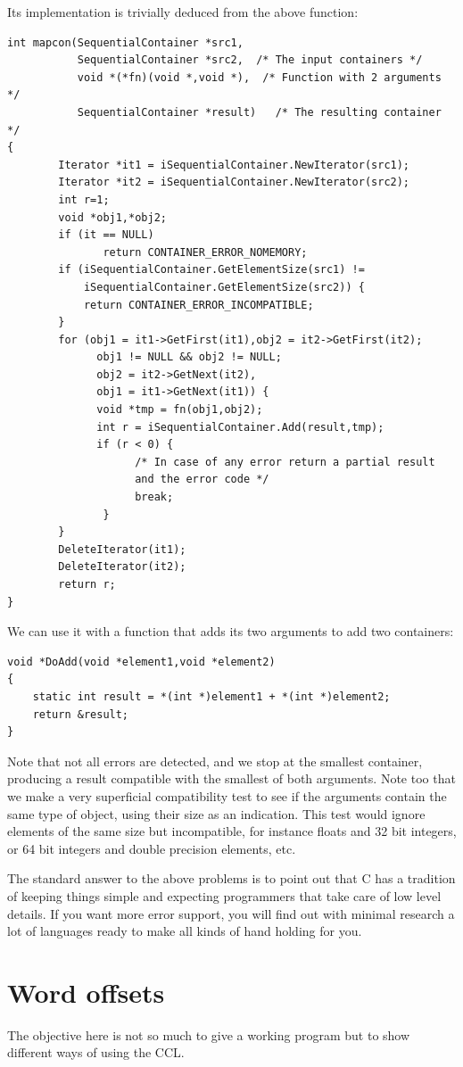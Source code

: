 \documentclass[12pt,a4paper]{memoir} %
\begin{document}
{{Its implementation is trivially deduced from the above function:
\begin{verbatim}
int mapcon(SequentialContainer *src1,
           SequentialContainer *src2,  /* The input containers */
           void *(*fn)(void *,void *),  /* Function with 2 arguments */
           SequentialContainer *result)   /* The resulting container */
{
        Iterator *it1 = iSequentialContainer.NewIterator(src1);
        Iterator *it2 = iSequentialContainer.NewIterator(src2);
        int r=1;
        void *obj1,*obj2;
        if (it == NULL)
               return CONTAINER_ERROR_NOMEMORY;
        if (iSequentialContainer.GetElementSize(src1) != 
            iSequentialContainer.GetElementSize(src2)) {
            return CONTAINER_ERROR_INCOMPATIBLE;
        }
        for (obj1 = it1->GetFirst(it1),obj2 = it2->GetFirst(it2);
              obj1 != NULL && obj2 != NULL;
              obj2 = it2->GetNext(it2),
              obj1 = it1->GetNext(it1)) {
              void *tmp = fn(obj1,obj2);
              int r = iSequentialContainer.Add(result,tmp);
              if (r < 0) {
                    /* In case of any error return a partial result 
                    and the error code */
                    break;
               }
        }
        DeleteIterator(it1);
        DeleteIterator(it2);
        return r;
}
\end{verbatim}
We can use it with a function  that adds its two arguments to add two containers:
\begin{verbatim}
void *DoAdd(void *element1,void *element2)
{
    static int result = *(int *)element1 + *(int *)element2;
    return &result;
}
\end{verbatim}
Note that not all errors are detected, and we stop at the smallest container, producing a result compatible with the smallest of both arguments.
Note too that we make a very superficial compatibility test to see if the arguments contain the same type of object, using their size as an indication. This test would ignore elements of the same size but incompatible, for instance floats and 32 bit integers, or 64 bit integers and double precision elements, etc.

The standard answer to the above problems is to point out that C has a tradition of keeping things simple and expecting programmers that take care of low level details. If you want more error support, you will find out with minimal research a lot of languages ready to make all kinds of hand holding for you.

\section{Word offsets}
The objective here is not so much to give a working program but to show different ways of using the CCL.
}}
\end{document}
